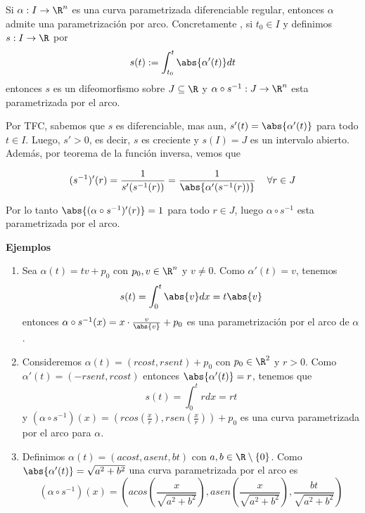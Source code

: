 \documentclass{article}
\begin{document}
\begin{teo}
    Si $\alpha: I\to\R^{n}$ es una curva parametrizada diferenciable regular, entonces $\alpha$
    admite una parametrización por arco. Concretamente , si $t_{0}\in I$ y definimos $s: I\to\R$ 
    por
    \begin{equation*}
        s(t):=\int_{t_{0}}^{t}\abs{\alpha'(t)}dt
    \end{equation*}
    entonces $s$ es un difeomorfismo sobre $J\subseteq\R$ y $\alpha\circ s^{-1}:J\to\R^{n}$ esta
    parametrizada por el arco.
\end{teo}

\begin{dem}
    Por TFC, sabemos que $s$ es diferenciable, mas aun, $s'(t)=\abs{\alpha'(t)}$ para todo 
    $t\in I$. Luego, $s'>0$, es decir, $s$ es creciente y $s(I)=J$ es un intervalo abierto. Además,
    por teorema de la función inversa, vemos que

    \begin{equation*}
        (s^{-1})'(r)=\frac{1}{s'(s^{-1}(r))}=\frac{1}{\abs{\alpha'(s^{-1}(r))}}\hspace{4mm}
        \forall r\in J
    \end{equation*}

    \noindent Por lo tanto $\abs{(\alpha\circ s^{-1})'(r)}=1$ para todo $r\in J$, luego 
    $\alpha\circ s^{-1}$ esta parametrizada por el arco.
\end{dem}

\noindent\textbf{Ejemplos}
\begin{enumerate}
    \item Sea $\alpha(t)=tv+p_{0}$ con $p_{0},v\in\R^{n}$ y $v\neq0$. Como $\alpha'(t)=v$, tenemos
    \begin{equation*}
        s(t)=\int_{0}^{t}\abs{v}dx=t\abs{v}
    \end{equation*}
    entonces $\alpha\circ s^{-1}(x)=x\cdot\frac{v}{\abs{v}}+p_{0}$ es una parametrización por el
    arco de $\alpha$.

    \item Consideremos $\alpha(t)=(rcost,rsent)+p_{0}$ con $p_{0}\in\R^{2}$ y $r>0$. Como 
    $\alpha'(t)=(-rsent,rcost)$ entonces $\abs{\alpha'(t)}=r$, tenemos que
    \begin{equation*}
        s(t)=\int_{0}^{t}rdx=rt
    \end{equation*}
    y $(\alpha\circ s^{-1})(x)=(rcos(\frac{x}{r}),rsen(\frac{x}{r}))+p_{0}$ es una curva 
    parametrizada por el arco para $\alpha$.

    \item Definimos $\alpha(t)=(acost,asent,bt)$ con $a,b\in\R\setminus\{0\}$. Como $\abs
    {\alpha'(t)}=\sqrt{a^{2}+b^{2}}$ una curva parametrizada por el arco es
    \begin{equation*}
        (\alpha\circ s^{-1})(x)=\left(acos\left(\frac{x}{\sqrt{a^{2}+b^{2}}}\right),
        asen\left(\frac{x}{\sqrt{a^{2}+b^{2}}}\right),\frac{bt}{\sqrt{a^{2}+b^{2}}}\right)
    \end{equation*}
\end{enumerate}
\end{document}
